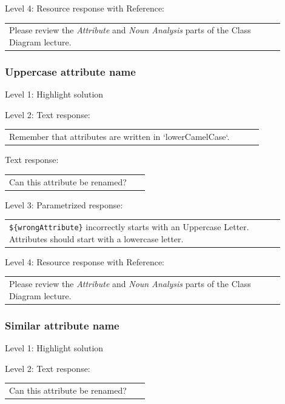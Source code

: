 \noindent Level 4: Resource response with Reference: \medskip

\begin{tabular}{|p{0.9\linewidth}}
Please review the \textit{Attribute} and \textit{Noun Analysis} parts of the Class Diagram lecture.
\end{tabular} \medskip


\subsubsection{Uppercase attribute name}

\noindent Level 1: Highlight solution \medskip

\noindent Level 2: Text response: \medskip

\begin{tabular}{|p{0.9\linewidth}}
Remember that attributes are written in `lowerCamelCase`.
\end{tabular} \medskip

Text response: \medskip

\begin{tabular}{|p{0.9\linewidth}}
Can this attribute be renamed?
\end{tabular} \medskip

\noindent Level 3: Parametrized response: \medskip

\begin{tabular}{|p{0.9\linewidth}}
\verb|${wrongAttribute}| incorrectly starts with an Uppercase Letter. Attributes should start with a lowercase letter.
\end{tabular} \medskip

\noindent Level 4: Resource response with Reference: \medskip

\begin{tabular}{|p{0.9\linewidth}}
Please review the \textit{Attribute} and \textit{Noun Analysis} parts of the Class Diagram lecture.
\end{tabular} \medskip


\subsubsection{Similar attribute name}

\noindent Level 1: Highlight solution \medskip

\noindent Level 2: Text response: \medskip

\begin{tabular}{|p{0.9\linewidth}}
Can this attribute be renamed?
\end{tabular} \medskip

